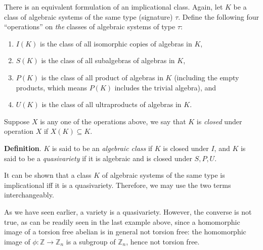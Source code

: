 \documentclass[12pt]{article}
\begin{document}
There is an equivalent formulation of an implicational class.  Again, let $K$ be a class of algebraic systems of the same type (signature) $\tau$.  Define the following four ``operations'' on \emph{the} classes of algebraic systems of type $\tau$:

\begin{enumerate}
\item $I(K)$ is the class of all isomorphic copies of algebras in $K$,
\item $S(K)$ is the class of all subalgebras of algebras in $K$,
\item $P(K)$ is the class of all product of algebras in $K$ (including the empty products, which means $P(K)$ includes the trivial algebra), and
\item $U(K)$ is the class of all ultraproducts of algebras in $K$.
\end{enumerate}

Suppose $X$ is any one of the operations above, we say that $K$ is \emph{closed} under operation $X$ if $X(K)\subseteq K$.

\textbf{Definition}.  $K$ is said to be an \emph{algebraic class} if $K$ is closed under $I$, and $K$ is said to be a \emph{quasivariety} if it is algebraic and is closed under $S,P,U$.

It can be shown that a class $K$ of algebraic systems of the same type is implicational iff it is a quasivariety.  Therefore, we may use the two terms interchangeably.  

As we have seen earlier, a variety is a quasivariety.  However, the converse is not true, as can be readily seen in the last example above, since a homomorphic image of a torsion free abelian is in general not torsion free: the homomorphic image of $\phi: \mathbb{Z}\to \mathbb{Z}_n$ is a subgroup of $\mathbb{Z}_n$, hence not torsion free.
\end{document}
